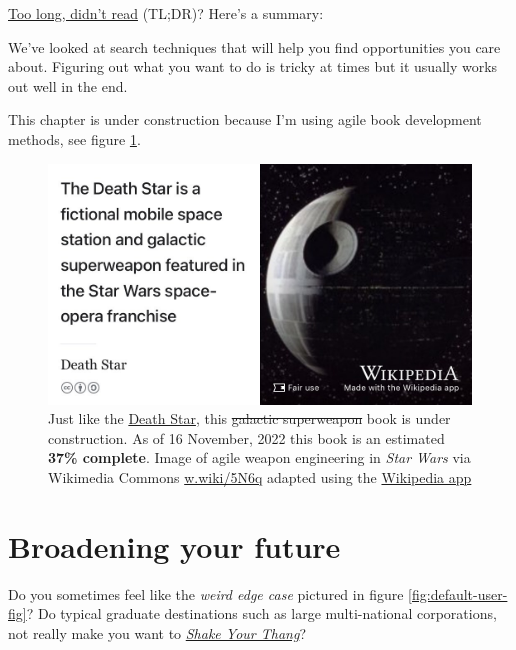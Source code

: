 \documentclass[
]{book}
\begin{document}
\href{https://en.wiktionary.org/wiki/too_long;_didn\%27t_read}{Too long, didn't read} (TL;DR)? Here's a summary:

We've looked at search techniques that will help you find opportunities you care about. Figuring out what you want to do is tricky at times but it usually works out well in the end.

This chapter is under construction because I'm using agile book development methods, see figure \ref{fig:deathstar5-fig}.

\begin{figure}

{\centering \includegraphics[width=0.99\linewidth]{images/DeathStar2} 

}

\caption{Just like the \href{https://en.wikipedia.org/wiki/Death_Star}{Death Star}, this \sout{galactic superweapon} book is under construction. As of 16 November, 2022 this book is an estimated \textbf{37\% complete}. Image of agile weapon engineering in \emph{Star Wars} via Wikimedia Commons \href{https://w.wiki/5N6q}{w.wiki/5N6q} adapted using the \href{https://apps.apple.com/gb/app/wikipedia/id324715238}{Wikipedia app}}\label{fig:deathstar5-fig}
\end{figure}

\hypertarget{broadening}{%
\chapter{Broadening your future}\label{broadening}}

Do you sometimes feel like the \emph{weird edge case} pictured in figure \ref{fig:default-user-fig}? Do typical graduate destinations such as large multi-national corporations, not really make you want to \emph{\href{https://en.wikipedia.org/wiki/Shake_Your_Thang}{Shake Your Thang}}? \citep{saltnpepa}
\end{document}
